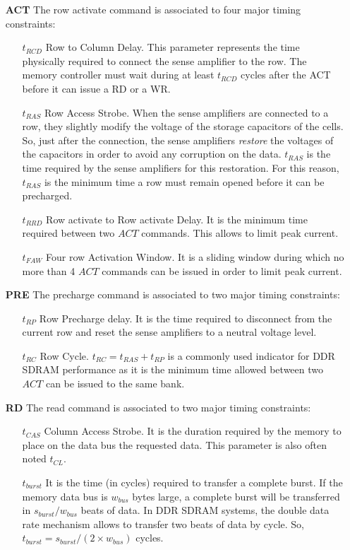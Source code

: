 \documentclass[main.tex]{subfiles}
\begin{document}
\begin{itemize}
    \item[\textbf{ACT}] The row activate command is associated to four major timing constraints:
        \begin{itemize}
            \item[$t_{RCD}$] Row to Column Delay. This parameter represents the time physically required to connect the sense amplifier to the row. The memory controller must wait during at least $t_{RCD}$ cycles after the ACT before it can issue a RD or a WR.
            \item[$t_{RAS}$] Row Access Strobe. When the sense amplifiers are connected to a row, they slightly modify the voltage of the storage capacitors of the cells. So, just after the connection, the sense amplifiers \emph{restore} the voltages of the capacitors in order to avoid any corruption on the data. $t_{RAS}$ is the time required by the sense amplifiers for this restoration. For this reason, $t_{RAS}$ is the minimum time a row must remain opened before it can be precharged.
            \item[$t_{RRD}$] Row activate to Row activate Delay. It is the minimum time required between two $ACT$ commands. This allows to limit peak current.
            \item[$t_{FAW}$] Four row Activation Window. It is a sliding window during which no more than 4 $ACT$ commands can be issued in order to limit peak current.
        \end{itemize}
    
    \item[\textbf{PRE}] The precharge command is associated to two major timing constraints:
        \begin{itemize}
            \item[$t_{RP}$] Row Precharge delay. It is the time required to disconnect from the current row and reset the sense amplifiers to a neutral voltage level.
            \item[$t_{RC}$] Row Cycle. $t_{RC} = t_{RAS} + t_{RP}$ is a commonly used indicator for DDR SDRAM performance as it is the minimum time allowed between two $ACT$ can be issued to the same bank.
        \end{itemize}

    \item[\textbf{RD}] The read command is associated to two major timing constraints:
        \begin{itemize}
            \item[$t_{CAS}$] Column Access Strobe. It is the duration required by the memory to place on the data bus the requested data. This parameter is also often noted $t_{CL}$.
            \item[$t_{burst}$]  It is the time (in cycles) required to transfer a complete burst. If the memory data bus is $w_{bus}$ bytes large, a complete burst will be transferred in ${s_{burst}}/{w_{bus}}$ beats of data. In DDR SDRAM systems, the double data rate mechanism allows to transfer two beats of data by cycle. So, $t_{burst} = {s_{burst}}/(2 \times w_{bus})$ cycles.
        \end{itemize}
    

\end{itemize}
\end{document}
